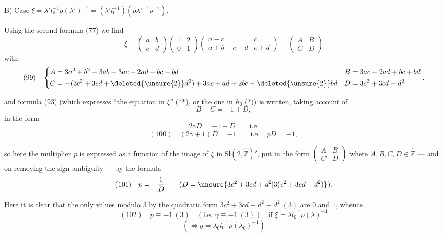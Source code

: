 B) Case $\xi=\lambda'l_0^{-1}\rho(\lambda')^{-1}=(\lambda'l_0^{-1})(\rho\lambda'^{-1}\rho^{-1})$.

Using the second formula (77) we find
\[
\xi=\begin{pmatrix}a&b\\c&d\end{pmatrix}
\begin{pmatrix}1&2\\0&1\end{pmatrix}
\begin{pmatrix}a-c&c\\a+b-c-d&c+d\end{pmatrix}
=\begin{pmatrix}A&B\\C&D\end{pmatrix}
\]
with
\[
(99)\quad
\left\{\begin{aligned}
A&=3a^2+b^2+3ab-3ac-2ad-bc-bd
& B&=3ac+2ad+bc+bd\\
C&=-(3c^2+3cd+\deleted{\unsure{2}}d^2)+3ac+ad+2bc+\deleted{\unsure{2}}bd
& D&=3c^2+3cd+d^2
\end{aligned}\right.,
\]

and formula (93) (which expresses ``the equation in $\xi$'' (**), or the one in $h_0$ (*)) is written,  taking account of
\[
B-C=-1+D,
\]
in the form \deleted{\unsure{$2\gamma$}}
\[
2\gamma D=-1-D\qquad\text{i.e.}
\]
\[
(100)\quad \boxed{(2\gamma+1)D=-1\qquad\text{i.e.}\quad pD=-1},
\]

so here the multiplier $p$ is expressed as a function of the image of $\xi$ in $\mathrm{Sl}(2,\widehat{\mathbb Z})'$, put in the form $\begin{pmatrix}A&B\\C&D\end{pmatrix}$ where $A,B,C,D\in\widehat{\mathbb Z}$ --- and on removing the sign ambiguity  --- by the formula
\[
(101)\quad p=-\frac1D\qquad(D=\unsure{3c^2+3cd+d^2|3(c^2+3cd+d^2)}).
\]


Here it is clear that the only values modulo $3$  by the quadratic form $3c^2+3cd+d^2\equiv d^2\ (3)$ are $0$ and $1$, whence
\[
(102)\quad p\equiv-1\ (3)\quad(\text{i.e. }\gamma\equiv-1\ (3))\quad\text{if }\xi=\lambda l_0^{-1}\rho(\lambda)^{-1}
\]
\[
(\Longleftrightarrow g=\lambda_0l_0^{-1}\rho(\lambda_0)^{-1})
\]

